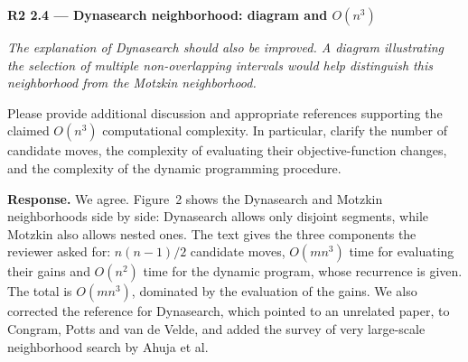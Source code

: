 \documentclass[12pt]{article}
\newenvironment{rc}[1]{\par\medskip\noindent\textbf{#1}\par\nopagebreak\noindent\itshape\renewcommand{\emph}[1]{\textbf{##1}}\ignorespaces}{\par}
\newcommand{\answer}[1]{\par\smallskip\noindent\textbf{Response.} #1\par}
\begin{document}
\begin{rc}{R2 2.4 --- Dynasearch neighborhood: diagram and $O(n^3)$}
The explanation of Dynasearch should also be improved. A diagram illustrating the selection of multiple non-overlapping intervals would help distinguish this neighborhood from the Motzkin neighborhood.

Please provide additional discussion and appropriate references supporting the claimed $O(n^3)$ computational complexity. In particular, clarify the number of candidate moves, the complexity of evaluating their objective-function changes, and the complexity of the dynamic programming procedure.
\end{rc}
\answer{We agree. Figure~2 shows the Dynasearch and Motzkin neighborhoods side by side: Dynasearch allows only disjoint segments, while Motzkin also allows nested ones. The text gives the three components the reviewer asked for: $n(n-1)/2$ candidate moves, $O(mn^3)$ time for evaluating their gains and $O(n^2)$ time for the dynamic program, whose recurrence is given. The total is $O(mn^3)$, dominated by the evaluation of the gains. We also corrected the reference for Dynasearch, which pointed to an unrelated paper, to Congram, Potts and van de Velde, and added the survey of very large-scale neighborhood search by Ahuja et al.}
\end{document}
